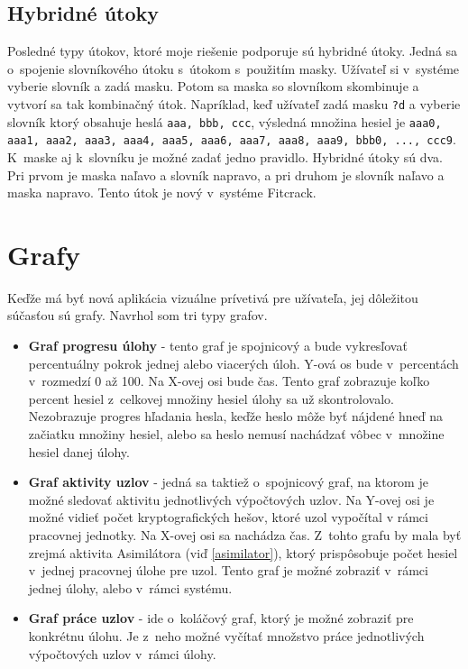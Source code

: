 \documentclass[slovak]{fitthesis}
\begin{document}
\subsection{Hybridné útoky} \label{hybridAttack}
Posledné typy útokov, ktoré moje riešenie podporuje sú hybridné útoky. Jedná sa o~spojenie slovníkového útoku s~útokom s~použitím masky. Užívateľ si v~systéme vyberie slovník a zadá masku. Potom sa maska so slovníkom skombinuje a vytvorí sa tak kombinačný útok. Napríklad, keď užívateľ zadá masku \texttt{?d} a vyberie slovník ktorý obsahuje heslá \texttt{aaa, bbb, ccc}, výsledná množina hesiel je 
\texttt{aaa0, aaa1, aaa2, aaa3, aaa4, aaa5, aaa6, aaa7, aaa8, aaa9, bbb0, ..., ccc9}. K~maske aj k~slovníku je možné zadať jedno pravidlo. Hybridné útoky sú dva. Pri prvom je maska naľavo a slovník napravo, a pri druhom je slovník naľavo a maska napravo. Tento útok je nový v~systéme Fitcrack.


\section{Grafy}\label{graphs}
Keďže má byť nová aplikácia vizuálne prívetivá pre užívateľa, jej dôležitou súčasťou sú grafy. Navrhol som tri typy grafov.
\begin{itemize}
    \item \textbf{Graf progresu úlohy} \label{progressGraph} - tento graf je spojnicový a bude vykresľovať percentuálny pokrok jednej alebo viacerých úloh. Y-ová os bude v~percentách v~rozmedzí 0 až 100. Na X-ovej osi bude čas. Tento graf zobrazuje koľko percent hesiel z~celkovej množiny hesiel úlohy sa už skontrolovalo. Nezobrazuje progres hľadania hesla, keďže heslo môže byť nájdené hneď na začiatku množiny hesiel, alebo sa heslo nemusí nachádzať vôbec v~množine hesiel danej úlohy.
    \item \textbf{Graf aktivity uzlov} - jedná sa taktiež o~spojnicový graf, na ktorom je možné sledovať aktivitu jednotlivých výpočtových uzlov. Na Y-ovej osi je možné vidieť počet kryptografických hešov, ktoré uzol vypočítal v rámci pracovnej jednotky. Na X-ovej osi sa nachádza čas. Z~tohto grafu by mala byť zrejmá aktivita Asimilátora (viď \ref{asimilator}), ktorý prispôsobuje počet hesiel v~jednej pracovnej úlohe pre uzol. Tento graf je možné zobraziť v~rámci jednej úlohy, alebo v~rámci systému.
    \item \textbf{Graf práce uzlov} - ide o~koláčový graf, ktorý je možné zobraziť pre konkrétnu úlohu. Je z~neho možné vyčítať množstvo práce jednotlivých výpočtových uzlov v~rámci úlohy.
\end{itemize}
\end{document}
